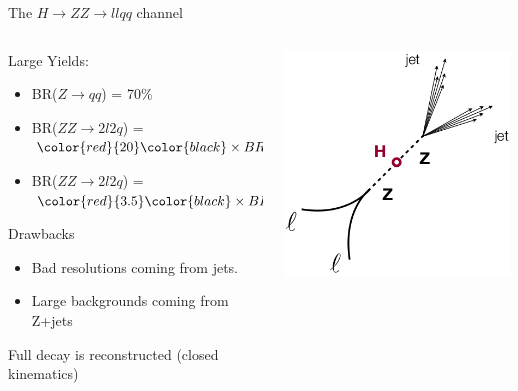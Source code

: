 \begin{frame}{The $H \rightarrow ZZ \rightarrow llqq$ channel}
\begin{center}
\begin{columns}
  \begin{column}{0.65\textwidth}
    Large Yields:
    \begin{itemize}
      \item
        BR($Z \rightarrow qq$) = 70\%
      \item
        BR($ZZ \rightarrow 2l2q$) = $\color{red}{20} \color{black} \times BR(ZZ \rightarrow 4l)$
      \item
        BR($ZZ \rightarrow 2l2q$) = $\color{red}{3.5} \color{black} \times BR(ZZ \rightarrow 2l2\nu)$
    \end{itemize}
\vspace{2em}
Drawbacks
\begin{itemize}
  \item
    Bad resolutions coming from jets.
    \item
      Large backgrounds coming from Z+jets
\end{itemize}
\vspace{2em}
Full decay is reconstructed (closed kinematics)
  \end{column}
  \begin{column}{0.35\textwidth}
    \includegraphics[width=0.99\textwidth]{images/h_zz_2l2q.png}
  \end{column}
\end{columns}

\end{center}
\end{frame}





